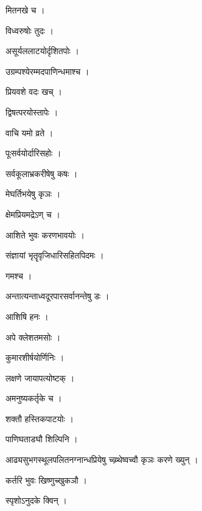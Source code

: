 \documentclass[10pt, openany]{book}
\begin{document}
\noindent मितनखे च ।

\noindent विध्वरुषोः तुदः ।

\noindent असूर्यललाटयोर्दृशितपोः ।

\noindent उग्रम्पश्येरम्मदपाणिन्धमाश्च ।

\noindent प्रियवशे वदः खच् ।

\noindent द्विषत्परयोस्तापेः ।

\noindent वाचि यमो व्रते ।

\noindent पूःसर्वयोर्दारिसहोः ।

\noindent सर्वकूलाभ्रकरीषेषु कषः ।

\noindent मेघर्तिभयेषु कृञः ।

\noindent क्षेमप्रियमद्रेऽण् च ।

\noindent आशिते भुवः करणभावयोः ।

\noindent संज्ञायां भृतॄवृजिधारिसहितपिदमः ।

\noindent गमश्च ।

\noindent अन्तात्यन्ताध्वदूरपारसर्वानन्तेषु डः ।

\noindent आशिषि हनः ।

\noindent अपे क्लेशतमसोः ।

\noindent कुमारशीर्षयोर्णिनिः ।

\noindent लक्षणे जायापत्योष्टक् ।

\noindent अमनुष्यकर्तृके च ।

\noindent शक्तौ हस्तिकपाटयोः ।

\noindent पाणिघताडघौ शिल्पिनि ।

\noindent आढ्यसुभगस्थूलपलितनग्नान्धप्रियेषु च्व्य्र्थेष्वच्वौ कृञः करणे ख्युन् ।

\noindent कर्तरि भुवः खिष्णुच्खुकञौ ।

\noindent स्पृशोऽनुदके क्विन् ।
\end{document}
